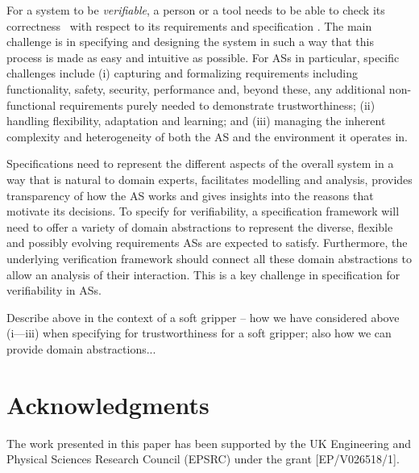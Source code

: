 \documentclass[lettersize,journal]{IEEEtran}
\begin{document}
For a system to be {\em verifiable\/}, a person or a tool needs to be able to check its correctness~\cite{ISO24765:2017} with respect to its requirements and specification \cite{Abeywickrama2022}. 
The main challenge is in specifying and designing the system in such a way that this process is made as easy and intuitive as possible.
%
For ASs in particular, specific challenges include 
%
(i) capturing and formalizing requirements including functionality, safety, security, performance and, beyond these, any additional non-functional requirements purely needed to demonstrate trustworthiness; 
%	 
(ii) handling flexibility, adaptation and learning; and 
%
(iii) managing the inherent complexity and heterogeneity of both the AS and the environment it operates in. 

Specifications need to represent the different aspects of the overall system in a way that is natural to domain experts, facilitates modelling and analysis, provides transparency of how the AS works and gives insights into the reasons that motivate its decisions. 
%
To specify for verifiability, a specification framework will need to offer a variety of domain abstractions to represent the diverse, flexible and possibly evolving requirements ASs are expected to satisfy. 
%
Furthermore, the underlying verification framework should connect all these domain abstractions to allow an analysis of their interaction. This is a key challenge in specification for verifiability in ASs.

Describe above in the context of a soft gripper – how we have considered above (i––iii) when specifying for trustworthiness for a soft gripper; also how we can provide domain abstractions...

\cite{Cheng2021,Bhattacharya2019,Bianchi2018,Cai2021,Chen2018,Hong2022,Farrell2022,Hwang2020,Liu2021,Loh2014,Mohan2020,Negrello2020,Nishikawa2019,Pozzi2016,Shin2021,Sotiropoulos2018,Tadakuma2020,Triantafyllou2019}


\section*{Acknowledgments}
The work presented in this paper has been supported by the UK Engineering and Physical Sciences Research Council (EPSRC) under the grant [EP/V026518/1].




\newpage

\vfill
\end{document}
